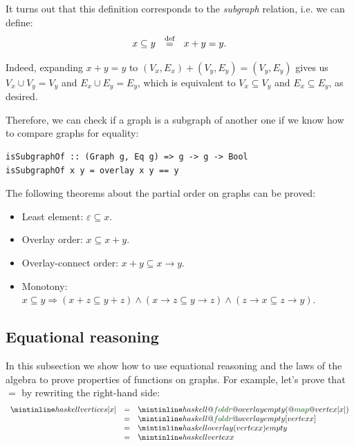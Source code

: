 \noindent
It turns out that this definition corresponds to the \emph{subgraph} relation,
i.e. we can define:
\[
x \subseteq y~~\stackrel{\text{def}}{=}~~x + y = y.
\]

\noindent
Indeed, expanding $x + y = y$ to $(V_x,E_x) + (V_y,E_y) = (V_y,E_y)$ gives us
$V_x \cup V_y = V_y$ and $E_x \cup E_y = E_y$, which is equivalent to
$V_x \subseteq V_y$ and $E_x \subseteq E_y$, as desired.

Therefore, we can check if a graph is a subgraph of another one if we know how to
compare graphs for equality:
\begin{verbatim}
isSubgraphOf :: (Graph g, Eq g) => g -> g -> Bool
isSubgraphOf x y = overlay x y == y
\end{verbatim}

The following theorems about the partial order on graphs can be proved:

\begin{itemize}
    \item Least element: $\varepsilon \subseteq x$.
    \item Overlay order: $x \subseteq x + y$.
    \item Overlay-connect order: $x + y \subseteq x \rightarrow y$.
    \item Monotony: $x \subseteq y \Rightarrow (x + z \subseteq y + z)
    \wedge (x \rightarrow z \subseteq y \rightarrow z)
    \wedge (z \rightarrow x \subseteq z \rightarrow y)$.

\end{itemize}

\subsection{Equational reasoning}\label{sub-reasoning}

In this subsection we show how to use equational reasoning and the laws
of the algebra to prove properties of functions on graphs.
For example, let's prove that  $=$  by rewriting
the right-hand side:
\[
\begin{array}{rcl}
\hs{vertices [x]} & = & \hs{@\std{foldr}@ overlay empty (@\std{map}@ vertex [x])}\\
 & = & \hs{@\std{foldr}@ overlay empty [vertex x]}\\
 & = & \hs{overlay (vertex x) empty}\\
 & = & \hs{vertex x}\\
\end{array}
\]

